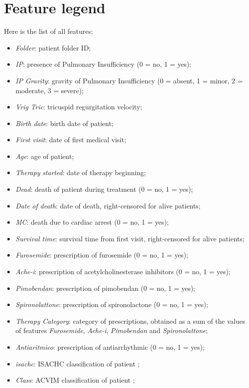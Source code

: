 \documentclass[12pt]{report}
\begin{document}
\section{Feature legend}
Here is the list of all features:
\begin{itemize}
\item \textit{Folder}: patient folder ID;
\item \textit{IP}: presence of Pulmonary Insufficiency (0 = no, 1 = yes);
\item \textit{IP Gravity}: gravity of Pulmonary Insufficiency (0 = absent, 1 = minor, 2 = moderate, 3 = severe);
\item \textit{Vrig Tric}: tricuspid regurgitation velocity;
\item \textit{Birth date}: birth date of patient;
\item \textit{First visit}: date of first medical visit;
\item \textit{Age}: age of patient;
\item \textit{Therapy started}: date of therapy beginning;
\item \textit{Dead}: death of patient during treatment (0 = no, 1 = yes);
\item \textit{Date of death}: date of death, right-censored for alive patients;
\item \textit{MC}: death due to cardiac arrest (0 = no, 1 = yes);
\item \textit{Survival time}: survival time from first visit, right-censored for alive patients;
\item \textit{Furosemide}: prescription of furosemide (0 = no, 1 = yes);
\item \textit{Ache-i}: prescription of acetylcholinesterase inhibitors (0 = no, 1 = yes);
\item \textit{Pimobendan}: prescription of pimobendan (0 = no, 1 = yes);
\item \textit{Spironolattone}: prescription of spironolactone (0 = no, 1 = yes);
\item \textit{Therapy Category}: category of prescriptions, obtained as a sum of the values of features \textit{Furosemide}, \textit{Ache-i}, \textit{Pimobendan} and \textit{Spironolattone};
\item \textit{Antiaritmico}: prescription of antiarrhythmic (0 = no, 1 = yes);
\item \textit{isachc}: ISACHC classification of patient \cite{isachc};
\item \textit{Class}: ACVIM classification of patient \cite{acvim};

\end{itemize}
\end{document}
